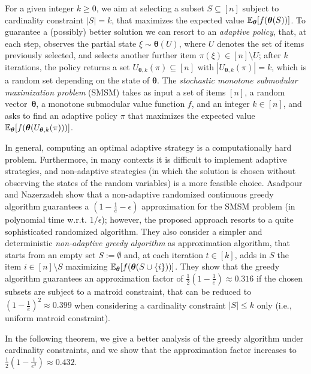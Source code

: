 For a given integer $k\geq 0$, we aim at selecting a subset $S\subseteq [n]$ subject to cardinality constraint $|S|=k$, that maximizes the expected value $\mathbb{E}_{\bm \theta}[f(\bm \theta(S))]$. To guarantee a (possibly) better solution we can resort to an {\em adaptive policy}, that, at each step, observes the partial state $\xi\sim\bm \theta(U)$, where $U$ denotes the set of items previously selected, and selects another further item $\pi(\xi)\in [n]\setminus U$;  after $k$ iterations, the policy returns a set $U_{\bm\theta,k}(\pi)\subseteq [n]$ with $|U_{\bm\theta,k}(\pi)|=k$, which is a random set depending on the state of $\bm \theta$. The {\em stochastic monotone submodular maximization problem} (SMSM) takes as input a set of items $[n]$, a random vector~$\bm \theta$, a monotone submodular value function $f$, and an integer $k\in [n]$, and asks to find an adaptive policy $\pi$ that maximizes the expected value $\mathbb{E}_{\bm \theta}[f(\bm \theta(U_{\bm\theta,k}(\pi)))]$. 

In general, computing an optimal adaptive strategy is a computationally hard problem. Furthermore, in many contexts it is difficult to implement adaptive strategies, and non-adaptive strategies (in which the solution is chosen without observing the states of the random variables) is a more feasible choice. Asadpour and Nazerzadeh \cite{Asadpour16} show that a non-adaptive randomized continuous greedy algorithm guarantees a $\left(1-\frac{1}{e}-\epsilon\right)$ approximation for the SMSM problem (in polynomial time w.r.t. $1/\epsilon$); however, the proposed approach resorts to a quite sophisticated randomized algorithm. They also consider a simpler and deterministic {\em non-adaptive greedy algorithm} as approximation algorithm, that starts from an empty set $S:=\emptyset$ and, at each iteration $t\in [k]$, adds in $S$ the item $i\in [n]\setminus S$ maximizing $\mathbb{E}_{\bm \theta}[f(\bm \theta(S\cup\{i\}))]$. They show that the greedy algorithm guarantees an approximation factor of $\frac{1}{2}\left(1-\frac{1}{e}\right)\approx 0.316$ if the chosen subsets are subject to a matroid constraint, that can be reduced to $\left(1-\frac{1}{e}\right)^2\approx 0.399$ when considering a cardinality constraint $|S|\leq k$ only (i.e., uniform matroid constraint). 

In the following theorem, we give a better analysis of the greedy algorithm under cardinality constraints, and we show that the approximation factor increases to $\frac{1}{2}\left(1-\frac{1}{e^2}\right)\approx 0.432$. 

